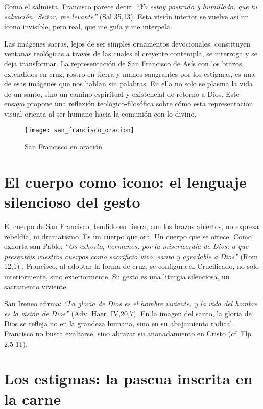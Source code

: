 \documentclass[12pt]{article}
\begin{document}
	Como el salmista, Francisco parece decir: \textit{“Yo estoy postrado y humillado; que tu salvación, Señor, me levante”} (Sal 35,13)\cite{biblia}. Esta visión interior se vuelve así un ícono invisible, pero real, que me guía y me interpela.
	
	Las imágenes sacras, lejos de ser simples ornamentos devocionales, constituyen ventanas teológicas a través de las cuales el creyente contempla, se interroga y se deja transformar. La representación de San Francisco de Asís con los brazos extendidos en cruz, rostro en tierra y manos sangrantes por los estigmas, es una de esas imágenes que nos hablan sin palabras. En ella no solo se plasma la vida de un santo, sino un camino espiritual y existencial de retorno a Dios. Este ensayo propone una reflexión teológico-filosófica sobre cómo esta representación visual orienta al ser humano hacia la comunión con lo divino.
	
	
\begin{figure}[!h]
	\centering
	\texttt{[image: san\_francisco\_oracion]}
	\caption{San Francisco en oraci\'on}
	\label{fig:sanfranciscooracion}
\end{figure}

	
	\section{El cuerpo como icono: el lenguaje silencioso del gesto}
	
	El cuerpo de San Francisco, tendido en tierra, con los brazos abiertos, no expresa rebeldía, ni dramatismo. Es un cuerpo que ora. Un cuerpo que se ofrece. Como exhorta san Pablo: \textit{“Os exhorto, hermanos, por la misericordia de Dios, a que presentéis vuestros cuerpos como sacrificio vivo, santo y agradable a Dios”} (Rom 12,1) \cite{biblia}. Francisco, al adoptar la forma de cruz, se configura al Crucificado, no solo interiormente, sino exteriormente. Su gesto es una liturgia silenciosa, un sacramento viviente.
	
	San Ireneo afirma: \textit{“La gloria de Dios es el hombre viviente, y la vida del hombre es la visión de Dios”} (Adv. Haer. IV,20,7)\cite{ireneo}. En la imagen del santo, la gloria de Dios se refleja no en la grandeza humana, sino en su abajamiento radical. Francisco no busca exaltarse, sino abrazar su anonadamiento en Cristo (cf. Flp 2,5-11)\cite{biblia}.
	
	\section{Los estigmas: la pascua inscrita en la carne}
	
\end{document}
